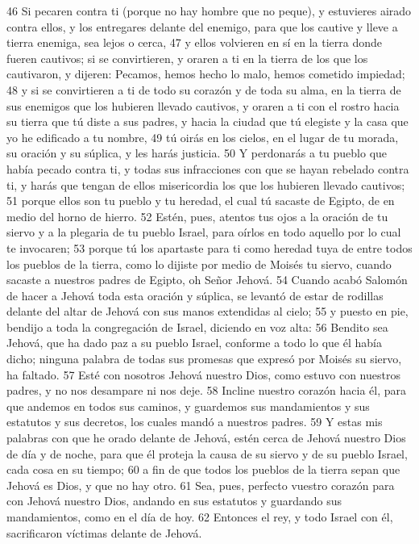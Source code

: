 46 Si pecaren contra ti (porque no hay hombre que no peque), y estuvieres airado contra ellos, y los entregares delante del enemigo, para que los cautive y lleve a tierra enemiga, sea lejos o cerca,
47 y ellos volvieren en sí en la tierra donde fueren cautivos; si se convirtieren, y oraren a ti en la tierra de los que los cautivaron, y dijeren: Pecamos, hemos hecho lo malo, hemos cometido impiedad;
48 y si se convirtieren a ti de todo su corazón y de toda su alma, en la tierra de sus enemigos que los hubieren llevado cautivos, y oraren a ti con el rostro hacia su tierra que tú diste a sus padres, y hacia la ciudad que tú elegiste y la casa que yo he edificado a tu nombre,
49 tú oirás en los cielos, en el lugar de tu morada, su oración y su súplica, y les harás justicia.
50 Y perdonarás a tu pueblo que había pecado contra ti, y todas sus infracciones con que se hayan rebelado contra ti, y harás que tengan de ellos misericordia los que los hubieren llevado cautivos;
51 porque ellos son tu pueblo y tu heredad, el cual tú sacaste de Egipto, de en medio del horno de hierro.
52 Estén, pues, atentos tus ojos a la oración de tu siervo y a la plegaria de tu pueblo Israel, para oírlos en todo aquello por lo cual te invocaren;
53 porque tú los apartaste para ti como heredad tuya de entre todos los pueblos de la tierra, como lo dijiste por medio de Moisés tu siervo, cuando sacaste a nuestros padres de Egipto, oh Señor Jehová.
54 Cuando acabó Salomón de hacer a Jehová toda esta oración y súplica, se levantó de estar de rodillas delante del altar de Jehová con sus manos extendidas al cielo;
55 y puesto en pie, bendijo a toda la congregación de Israel, diciendo en voz alta:
56 Bendito sea Jehová, que ha dado paz a su pueblo Israel, conforme a todo lo que él había dicho; ninguna palabra de todas sus promesas que expresó por Moisés su siervo, ha faltado. 
57 Esté con nosotros Jehová nuestro Dios, como estuvo con nuestros padres, y no nos desampare ni nos deje.
58 Incline nuestro corazón hacia él, para que andemos en todos sus caminos, y guardemos sus mandamientos y sus estatutos y sus decretos, los cuales mandó a nuestros padres.
59 Y estas mis palabras con que he orado delante de Jehová, estén cerca de Jehová nuestro Dios de día y de noche, para que él proteja la causa de su siervo y de su pueblo Israel, cada cosa en su tiempo;
60 a fin de que todos los pueblos de la tierra sepan que Jehová es Dios, y que no hay otro.
61 Sea, pues, perfecto vuestro corazón para con Jehová nuestro Dios, andando en sus estatutos y guardando sus mandamientos, como en el día de hoy.
62 Entonces el rey, y todo Israel con él, sacrificaron víctimas delante de Jehová.
